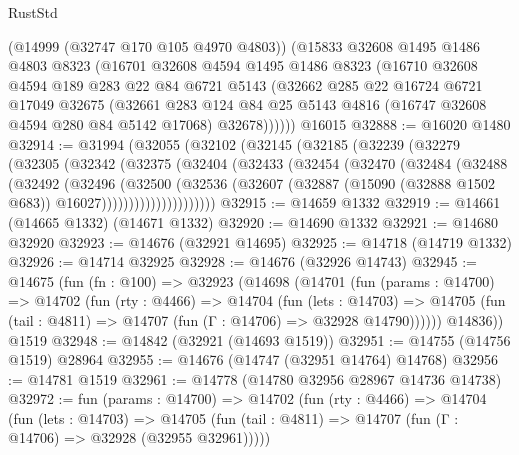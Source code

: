 \begin{lexlean}{RustStd}
\begin{coremodule}
      (@14999 (@32747 @170 @105 @4970 @4803))
      (@15833
        @32608
        @1495
        @1486
        @4803
        @8323
        (@16701
          @32608
          @4594
          @1495
          @1486
          @8323
          (@16710
            @32608
            @4594
            @189
            @283
            @22
            @84
            @6721
            @5143
            (@32662
              @285
              @22
              @16724
              @6721
              @17049
              @32675
              (@32661
                @283
                @124
                @84
                @25
                @5143
                @4816
                (@16747 @32608 @4594 @280 @84 @5142 @17068)
                @32678))))))
    @16015
@32888 := @16020 @1480
@32914 := @31994
    (@32055
      (@32102
        (@32145
          (@32185
            (@32239
              (@32279
                (@32305
                  (@32342
                    (@32375
                      (@32404
                        (@32433
                          (@32454
                            (@32470
                              (@32484
                                (@32488
                                  (@32492
                                    (@32496
                                      (@32500
                                        (@32536
                                          (@32607
                                            (@32887
                                              (@15090 (@32888 @1502 @683))
                                              @16027)))))))))))))))))))))
@32915 := @14659 @1332
@32919 := @14661 (@14665 @1332) (@14671 @1332)
@32920 := @14690 @1332
@32921 := @14680 @32920
@32923 := @14676 (@32921 @14695)
@32925 := @14718 (@14719 @1332)
@32926 := @14714 @32925
@32928 := @14676 (@32926 @14743)
@32945 := @14675
    (fun (fn : @100) =>
    @32923
      (@14698
        (@14701
          (fun (params : @14700) =>
          @14702
            (fun (rty : @4466) =>
            @14704
              (fun (lets : @14703) =>
              @14705 (fun (tail : @4811) => @14707 (fun (Γ : @14706) => @32928 @14790))))))
        @14836))
    @1519
@32948 := @14842 (@32921 (@14693 @1519))
@32951 := @14755 (@14756 @1519) @28964
@32955 := @14676 (@14747 (@32951 @14764) @14768)
@32956 := @14781 @1519
@32961 := @14778 (@14780 @32956 @28967 @14736 @14738)
@32972 := fun (params : @14700) =>
  @14702
    (fun (rty : @4466) =>
    @14704
      (fun (lets : @14703) =>
      @14705 (fun (tail : @4811) => @14707 (fun (Γ : @14706) => @32928 (@32955 @32961)))))

\end{coremodule}
\end{lexlean}
